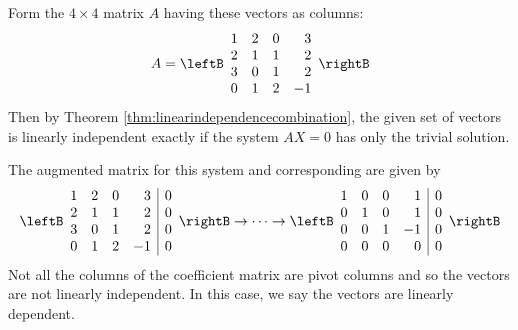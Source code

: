 \begin{solution}
Form the $4 \times 4$  matrix $A$ having these vectors as columns:
\begin{equation*}
A= \leftB 
\begin{array}{rrrr}
1 & 2 & 0 & 3 \\ 
2 & 1 & 1 & 2 \\ 
3 & 0 & 1 & 2 \\ 
0 & 1 & 2 & -1
\end{array}
\rightB
\end{equation*}
Then by Theorem \ref{thm:linearindependencecombination}, the given set of vectors is linearly independent
exactly if the system $AX=0$ has only the trivial solution.

The augmented matrix for this system and corresponding \rref \;are given by  
\begin{equation*}
 \leftB 
\begin{array}{rrrr|r}
1 & 2 & 0 & 3 & 0 \\ 
2 & 1 & 1 & 2 & 0 \\ 
3 & 0 & 1 & 2 & 0 \\ 
0 & 1 & 2 & -1 & 0 
\end{array}
\rightB
\rightarrow \cdots \rightarrow
\leftB 
\begin{array}{rrrr|r}
1 & 0 & 0 & 1 & 0 \\ 
0 & 1 & 0 & 1 & 0 \\ 
0 & 0 & 1 & -1 & 0 \\ 
0 & 0 & 0 & 0 & 0 
\end{array}
\rightB 
\end{equation*}
Not all the columns of the coefficient matrix are pivot columns and so the vectors are not linearly independent. In this case, we say the vectors are linearly dependent. 


\end{solution}
